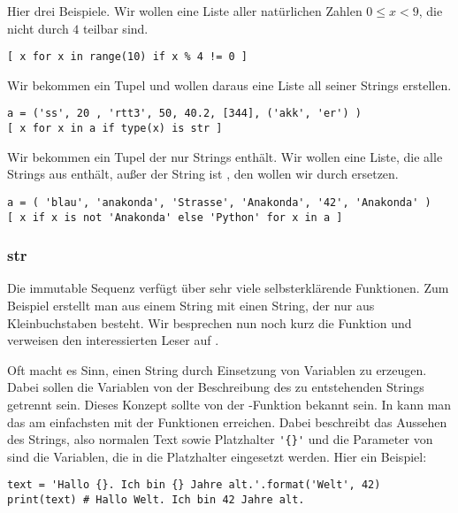 Hier drei Beispiele.
Wir wollen eine Liste aller natürlichen Zahlen $0 \le x < 9$, die nicht durch $4$ teilbar sind.
\begin{lstlisting}
[ x for x in range(10) if x % 4 != 0 ]
\end{lstlisting}
Wir bekommen ein Tupel  und wollen daraus eine Liste all seiner Strings erstellen.
\begin{lstlisting}
a = ('ss', 20 , 'rtt3', 50, 40.2, [344], ('akk', 'er') )
[ x for x in a if type(x) is str ]
\end{lstlisting}
Wir bekommen ein Tupel  der nur Strings enthält.
Wir wollen eine Liste, die alle Strings aus  enthält, außer der String ist , den wollen wir durch  ersetzen.
\begin{lstlisting}
a = ( 'blau', 'anakonda', 'Strasse', 'Anakonda', '42', 'Anakonda' )
[ x if x is not 'Anakonda' else 'Python' for x in a ]
\end{lstlisting}


\subsubsection{str}
\label{section:std_data_types:sequenzen:str}
Die immutable Sequenz  verfügt über sehr viele selbsterklärende Funktionen.
Zum Beispiel erstellt man aus einem String  mit  einen String, der nur aus Kleinbuchstaben besteht.
Wir besprechen nun noch kurz die Funktion  und verweisen den interessierten Leser auf \cite[Library, Build-in Types, Text Sequence Type]{Python3}.

Oft macht es Sinn, einen String durch Einsetzung von Variablen zu erzeugen.
Dabei sollen die Variablen von der Beschreibung des zu entstehenden Strings getrennt sein.
Dieses Konzept sollte von der \C-Funktion  bekannt sein.
In \Python kann man das am einfachsten mit der Funktionen  erreichen.
Dabei beschreibt  das Aussehen des Strings, also normalen Text sowie Platzhalter \lstinline[style=PyInline]|'{}'| und
die Parameter von  sind die Variablen, die in die Platzhalter eingesetzt werden.
Hier ein Beispiel:
\begin{lstlisting}
text = 'Hallo {}. Ich bin {} Jahre alt.'.format('Welt', 42)
print(text) # Hallo Welt. Ich bin 42 Jahre alt.
\end{lstlisting}

